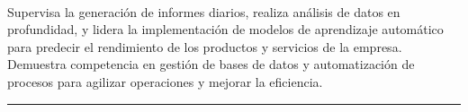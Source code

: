 \documentclass[]{rahulworld-resume}
\begin{document}
\begin{minipage}[t]{0.66\textwidth}
    \\
    \noindent
    \hspace{5em}%
    \begin{minipage}{0.85\textwidth\vspace{2pt}}
        Supervisa la generación de informes diarios, realiza análisis de datos en profundidad, y lidera la implementación de modelos de aprendizaje automático para predecir el rendimiento de los productos y servicios de la empresa. Demuestra competencia en gestión de bases de datos y automatización de procesos para agilizar operaciones y mejorar la eficiencia.
    \end{minipage}
    \sectionsep

    \noindent\rule{12.5cm}{0.4pt}








\end{minipage}
\end{document}
